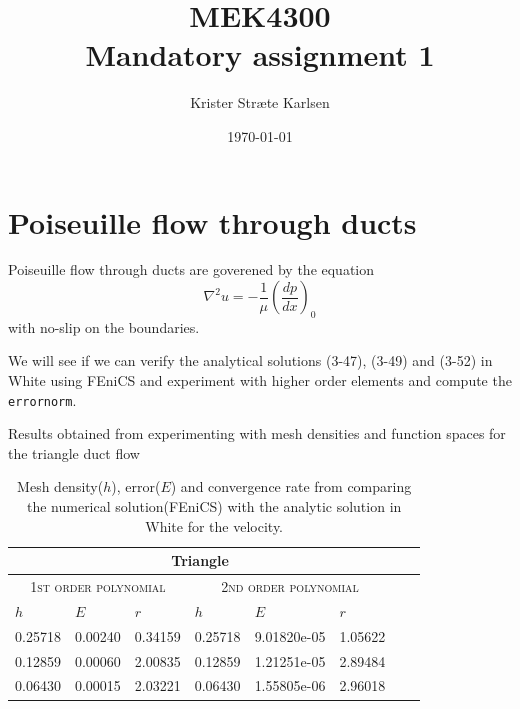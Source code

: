 \documentclass[11pt,a4paper,english]{article}
\title{MEK4300\\Mandatory assignment 1}
\author{Krister Stræte Karlsen}
\date{\today}
\numberwithin{equation}{section}
\begin{document}
\maketitle

\section{Poiseuille flow through ducts}

Poiseuille flow through ducts are goverened by the equation 
\begin{equation}
\nabla^2 u = -\frac{1}{\mu}\left( \frac{dp}{dx} \right)_0  
\end{equation}
with no-slip on the boundaries.  

We will see if we can verify the analytical solutions (3-47), (3-49) and (3-52) in White using FEniCS and experiment with higher order elements and compute the \texttt{errornorm}. 

Results obtained from experimenting with mesh densities and function spaces for the triangle duct flow

\begin{table}[H]
\centering
\caption{Mesh density($h$), error($E$) and convergence rate from comparing the numerical solution(FEniCS) with the analytic solution in White for the velocity. }
\vspace{3mm}
\begin{tabular}{|l|l|l|l|l|l|l|l|}
\hline
 \multicolumn{6}{|c|}{\textbf{Triangle}}   \\
\hline
 \multicolumn{3}{|c|}{ \textsc{1st order polynomial}} &  \multicolumn{3}{|c|}{\textsc{2nd order polynomial}}  \\
\hline
$h$ & $E$ & $r$ & $h$ & $E$ & $r$   \\
\hline
0.25718 & 0.00240 & 0.34159	& 0.25718 & 9.01820e-05 & 1.05622 \\
0.12859 & 0.00060 & 2.00835	& 0.12859 & 1.21251e-05 & 2.89484 \\
0.06430 & 0.00015 & 2.03221 & 0.06430 & 1.55805e-06 & 2.96018	\\ 
\hline
\end{tabular}
\label{tab:time}
\end{table}
\end{document}
